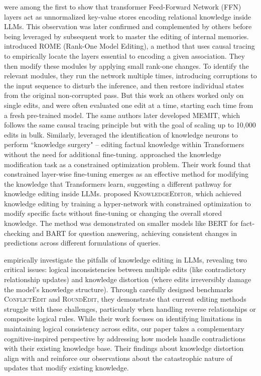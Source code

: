 \citet{Geva2020} were among the first to show that transformer Feed-Forward Network (FFN) layers act as unnormalized key-value stores encoding relational knowledge inside LLMs. This observation was later confirmed and complemented by others \citep{Meng2022,Dai2021} before being leveraged by subsequent work to master the editing of internal memories.
\citet{Meng2022} introduced ROME (Rank-One Model Editing), a method that uses causal tracing to empirically locate the layers essential to encoding a given association. They then modify these modules by applying small rank-one changes. To identify the relevant modules, they run the network multiple times, introducing corruptions to the input sequence to disturb the inference, and then restore individual states from the original non-corrupted pass. But this work an others worked only on single edits, and were often evaluated one edit at a time, starting each time from a fresh pre-trained model. The same authors later developed MEMIT, which follows the same causal tracing principle but with the goal of scaling up to 10,000 edits in bulk\citep{Meng2022a}.
Similarly, \citet{Dai2021} leveraged the identification of knowledge neurons to perform ``knowledge surgery" – editing factual knowledge within Transformers without the need for additional fine-tuning.
\citet{Zhu2020} approached the knowledge modification task as a constrained optimization problem. Their work found that constrained layer-wise fine-tuning emerges as an effective method for modifying the knowledge that Transformers learn, suggesting a different pathway for knowledge editing inside LLMs.
\citet{DeCao2021} proposed \textsc{KnowledgeEditor}, which achieved knowledge editing by training a hyper-network with constrained optimization to modify specific facts without fine-tuning or changing the overall stored knowledge. The method was demonstrated on smaller models like BERT for fact-checking and BART for question answering, achieving consistent changes in predictions across different formulations of queries.

\citet{li2023unveiling}  empirically investigate the pitfalls of knowledge editing in LLMs, revealing two critical issues: logical inconsistencies between multiple edits (like contradictory relationship updates) and knowledge distortion (where edits irreversibly damage the model's knowledge structure). Through carefully designed benchmarks \textsc{ConflictEdit} and \textsc{RoundEdit}, they demonstrate that current editing methods struggle with these challenges, particularly when handling reverse relationships or composite logical rules. While their work focuses on identifying limitations in maintaining logical consistency across edits, our paper takes a complementary cognitive-inspired perspective by addressing how models handle contradictions with their existing knowledge base. Their findings about knowledge distortion align with and reinforce our observations about the catastrophic nature of updates that modify existing knowledge.

